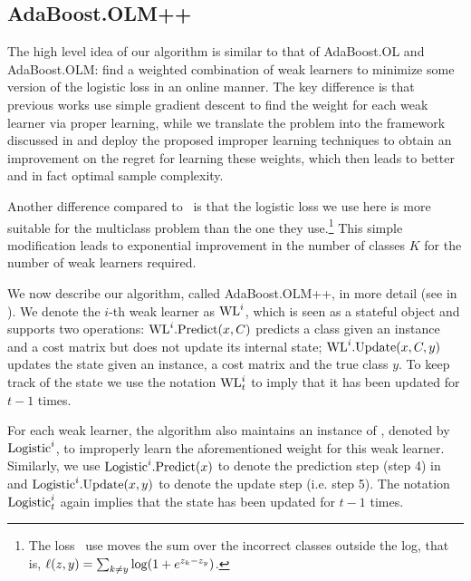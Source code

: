 \subsection{AdaBoost.OLM++}
The high level idea of our algorithm is similar to that of AdaBoost.OL and AdaBoost.OLM:
find a weighted combination of weak learners to minimize some version of the logistic loss in an online manner.
The key difference is that previous works use simple gradient descent to find the weight for each weak learner via proper learning,
while we translate the problem into the framework discussed in  and deploy the proposed improper learning techniques 
to obtain an improvement on the regret for learning these weights, which then leads to better and in fact optimal sample complexity.

Another difference compared to~\citep{jung2017onlinemulticlass} is that the logistic loss we use
here is more suitable for the multiclass problem than the one they use.\footnote{%
The loss~\citet{jung2017onlinemulticlass} use moves the sum over the incorrect classes outside the log, that is, $\ls(z, y) = \sum_{k\neq y}\log\prn*{1 + e^{z_k-z_y}}$.
}
This simple modification leads to exponential improvement in the number of classes $K$ for the number of weak learners required.

We now describe our algorithm, called AdaBoost.OLM++, in more detail (see  in ). 
We denote the $i$-th weak learner as $\text{WL}^{i}$, which is seen as a stateful object and supports two operations:
$\text{WL}^{i}.\text{Predict}(x, C)$ predicts a class given an instance and a cost matrix but does not update its internal state;
$\text{WL}^{i}.\text{Update}(x, C, y)$ updates the state given an instance, a cost matrix and the true class $y$. 
To keep track of the state we use the notation $\text{WL}^{i}_{t}$ to imply that it has been updated for $t-1$ times.

For each weak learner, the algorithm also maintains an instance of , denoted by $\text{Logistic}^i$,
to improperly learn the aforementioned weight for this weak learner.
Similarly, we use $\text{Logistic}^i.\text{Predict}(x)$ to denote the prediction step (step 4) in  and $\text{Logistic}^i.\text{Update}(x, y)$ to denote the update step (i.e. step 5).
The notation $\text{Logistic}^i_t$ again implies that the state has been updated for $t-1$ times.

